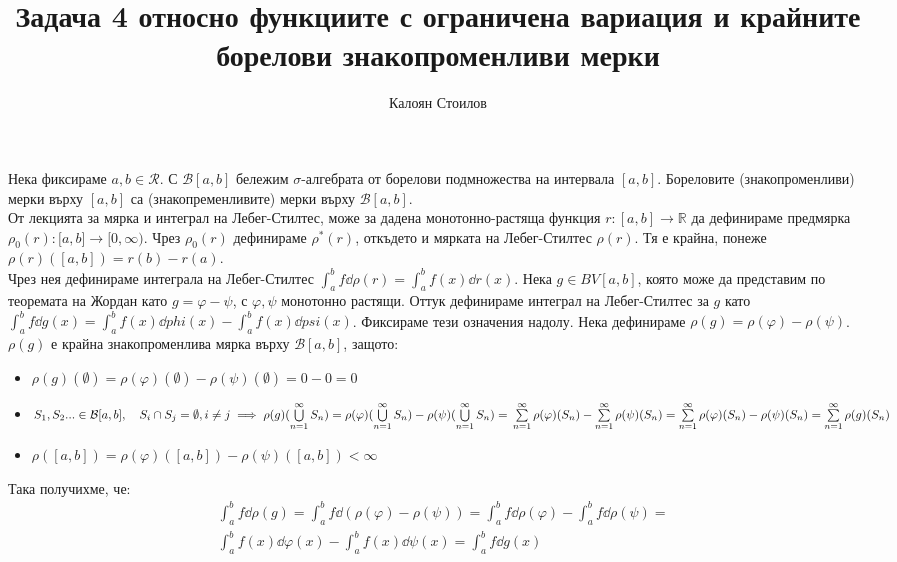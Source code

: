 \documentclass[bulgarian, 12pt]{article}
\title{\textbf{Задача 4} относно функциите с ограничена вариация и крайните борелови знакопроменливи мерки}
\author{Калоян Стоилов}
\begin{document}
\maketitle
Нека фиксираме $a,b \in \mathscr{R}$. С $\mathcal{B}[a, b]$ бележим $\sigma$-алгебрата от борелови подмножества на интервала $[a,b]$.
Бореловите (знакопроменливи) мерки върху $[a,b]$ са (знакопременливите) мерки върху $\mathcal{B}[a, b]$. \\
От лекцията за мярка и интеграл на Лебег-Стилтес, може за дадена монотонно-растяща функция $r:[a,b] \to \mathbb{R}$ да дефинираме предмярка $\rho_0(r):\mathscr[a, b]\to[0,\infty)$.
Чрез $\rho_0(r)$ дефинираме $\rho^*(r)$, откъдето и мярката на Лебег-Стилтес $\rho(r)$.
Тя е крайна, понеже $\rho(r)([a,b])=r(b)-r(a)$. \\
Чрез нея дефинираме интеграла на Лебег-Стилтес $\int_a^b f \dd \rho(r) = \int_a^b f(x) \dd r(x)$.
Нека $g \in BV[a,b]$, която може да представим по теоремата на Жордан като $g=\varphi-\psi$, с $\varphi, \psi$ монотонно растящи. Оттук дефинираме интеграл на Лебег-Стилтес за $g$ като $\int_a^b f \dd g(x) = \int_a^b f(x) \dd phi(x) - \int_a^b f(x) \dd psi(x)$. Фиксираме тези означения надолу.
Нека дефинираме $\rho(g) = \rho(\varphi) - \rho(\psi)$. $\rho(g)$ е крайна знакопроменлива мярка върху $\mathcal{B}[a, b]$, защото:
\begin{itemize}
  \item $\rho(g)(\emptyset) =  \rho(\varphi)(\emptyset) - \rho(\psi)(\emptyset) = 0 - 0 = 0$
  \item $S_1,S_2... \in \mathcal{B}[a, b], \quad S_i \cap S_j =
    \emptyset, i \neq j \implies \rho(g)(\bigcup\limits_{n=1}^\infty S_n) =
    \rho(\varphi)(\bigcup\limits_{n=1}^\infty S_n) - \rho(\psi)(\bigcup\limits_{n=1}^\infty S_n) = \\
    \sum\limits_{n=1}^\infty \rho(\varphi)(S_n) - \sum\limits_{n=1}^\infty \rho(\psi)(S_n) =
    \sum\limits_{n=1}^\infty \rho(\varphi)(S_n) - \rho(\psi)(S_n) =
    \sum\limits_{n=1}^\infty \rho(g)(S_n)$
  \item $\rho([a, b]) = \rho(\varphi)([a, b]) - \rho(\psi)([a, b]) < \infty$
\end{itemize}
Така получихме, че:
\begin{align*}\label{eqn:1}
  \tag{1}
  &\int_a^b f \dd \rho(g) =
  \int_a^b f \dd (\rho(\varphi) - \rho(\psi)) =
  \int_a^b f \dd \rho(\varphi) - \int_a^b f \dd \rho(\psi) = \\
  & \int_a^b f(x) \dd \varphi(x) - \int_a^b f(x) \dd \psi(x) = \int_a^b f \dd g(x)
\end{align*}
\end{document}
